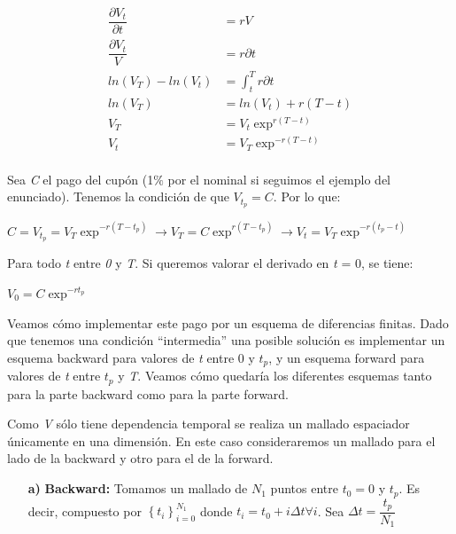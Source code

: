\documentclass[titlepage, 10pt,]{article}
\begin{document}
{\begin{align*}
	\dfrac{\partial V_{t}}{\partial t} &= rV \\
	\dfrac{\partial V_{t}}{V} &= r\partial t \\
	ln(V_{T}) - ln(V_{t}) &= \displaystyle \int_{t}^{T} r\partial t\\
	ln(V_{T}) &= ln(V_{t}) + r(T - t) \\
	V_{T} &= V_{t}\exp^{r(T-t)} \\
	V_{t} &= V_{T} \exp^{-r(T-t)} \\
\end{align*}

Sea \textit{C} el pago del cupón (1$\%$ por el nominal si seguimos el ejemplo del enunciado). Tenemos la condición de que $V_{t_{p}} = C$. Por lo que:

\begin{center}
	$C = V_{t_{p}} = V_{T} \exp^{-r(T-t_{p})} \longrightarrow V_{T} = C\exp^{r(T-t_{p})} \longrightarrow V_{t} = V_{T} \exp^{-r(t_{p}-t)} $
\end{center}
	
Para todo \textit{t} entre \textit{0} y \textit{T}. Si queremos valorar el derivado en  \textit{t} = 0, se tiene:

\begin{center}
	$V_{0} = C\exp^{-rt_{p}}$
\end{center}

Veamos cómo implementar este pago por un esquema de diferencias finitas. Dado que tenemos una condición “intermedia” una posible solución es implementar un esquema backward para valores de \textit{t} entre 0 y $t_{p}$, y un esquema forward para valores de \textit{t} entre $t_{p}$ y  \textit{T}. Veamos cómo quedaría los diferentes esquemas tanto para la parte backward como para la parte forward. 

\vspace{5pt}
Como \textit{V} sólo tiene dependencia temporal se realiza un mallado espaciador únicamente en una dimensión. En este caso consideraremos un mallado para el lado de la backward y otro para el de la forward.

\begin{itemize}
	\item[\textbf{a)}] \textbf{Backward:} Tomamos un mallado de $N_{1}$ puntos entre $t_{0} = 0$ y $t_{p}$. Es decir, compuesto por $\left\lbrace t_{i} \right\rbrace_{i = 0}^{N_{1}}$ donde $t_{i} = t_{0} + i \Delta t \forall i$. Sea $\Delta t = \dfrac{t_{p}}{N_{1}}$ 
	

\end{itemize}}
\end{document}
